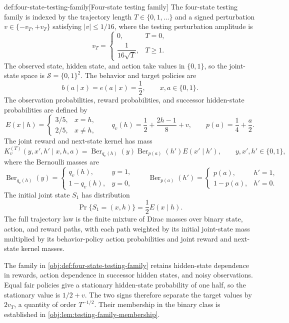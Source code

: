 \begin{definitionv}{def:four-state-testing-family}[Four-state testing family]
The four-state testing family is indexed by the trajectory length \(T\in\{0,1,\ldots\}\) and a signed perturbation \(v\in\{-v_T,+v_T\}\) satisfying \(|v|\le 1/16\), where the testing perturbation amplitude is
\[
v_T=
\begin{cases}
0,&T=0,\\
\dfrac{1}{16\sqrt T},&T\ge 1.
\end{cases}
\]
The observed state, hidden state, and action take values in \(\{0,1\}\), so the joint-state space is \(\mathcal S=\{0,1\}^2\). The behavior and target policies are
\[
b(a\mid x)=e(a\mid x)=\frac12,
\qquad x,a\in\{0,1\}.
\]
The observation probabilities, reward probabilities, and successor hidden-state probabilities are defined by
\[
E(x\mid h)=
\begin{cases}
3/5,&x=h,\\
2/5,&x\ne h,
\end{cases}
\qquad
q_v(h)=\frac12+\frac{2h-1}{8}+v,
\qquad
p(a)=\frac14+\frac a2.
\]
The joint reward and next-state kernel has mass
\[
K_v^{(T)}(y,x',h'\mid x,h,a)
=
\operatorname{Ber}_{q_v(h)}(y)
\operatorname{Ber}_{p(a)}(h')
E(x'\mid h'),
\qquad y,x',h'\in\{0,1\},
\]
where the Bernoulli masses are
\[
\operatorname{Ber}_{q_v(h)}(y)=
\begin{cases}
q_v(h),&y=1,\\
1-q_v(h),&y=0,
\end{cases}
\qquad
\operatorname{Ber}_{p(a)}(h')=
\begin{cases}
p(a),&h'=1,\\
1-p(a),&h'=0.
\end{cases}
\]
The initial joint state \(S_1\) has distribution
\[
\Pr\{S_1=(x,h)\}=\frac12 E(x\mid h).
\]
The full trajectory law is the finite mixture of Dirac masses over binary state, action, and reward paths, with each path weighted by its initial joint-state mass multiplied by its behavior-policy action probabilities and joint reward and next-state kernel masses.
\end{definitionv}

The family in \cref{obj:def:four-state-testing-family} retains hidden-state dependence in rewards, action dependence in successor hidden states, and noisy observations. Equal fair policies give a stationary hidden-state probability of one half, so the stationary value is \(1/2+v\). The two signs therefore separate the target values by \(2v_T\), a quantity of order \(T^{-1/2}\). Their membership in the binary class is established in \cref{obj:lem:testing-family-membership}.

